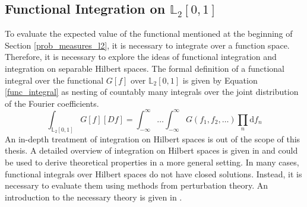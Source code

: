 \documentclass[12pt, a4paper]{article}
\theoremstyle{MAstyle} \newtheorem{assumption}{Assumption}[section]
\theoremstyle{MAstyle} \newtheorem{definition}{Definition}[section]
\theoremstyle{MAstyle} \newtheorem{theorem}{Theorem}[section]
\begin{document}
		\subsection{Functional Integration on $\mathbb{L}_2[0,1]$}\label{Integration}
			To evaluate the expected value of the functional mentioned at the beginning of Section \ref{prob_measures_l2}, it is necessary to integrate over a function space. Therefore, it is necessary to explore the ideas of functional integration and integration on separable Hilbert spaces. 
			The formal definition of a functional integral over the functional $G[f]$ over $\mathbb{L}_2[0,1]$ is given by Equation \ref{func_integral} as nesting of countably many integrals over the joint distribution of the Fourier coefficients. 
			\begin{equation}\label{func_integral}
				\int_{\mathbb{L}_2[0,1]} G\left[f\right] \left[Df\right] = \int_{-\infty}^{\infty}\dots\int_{-\infty}^{\infty} G\left(f_1, f_2, \dots\right) \prod_{n} \mathrm{d}f_n
			\end{equation}
			An in-depth treatment of integration on Hilbert spaces is out of the scope of this thesis. A detailed overview of integration on Hilbert spaces is given in \cite{skorohod_integration_1974} and could be used to derive theoretical properties in a more general setting. In many cases, functional integrals over Hilbert spaces do not have closed solutions. Instead, it is necessary to evaluate them using methods from perturbation theory. An introduction to the necessary theory is given in \cite{jeribi_perturbation_2021}.\\
			
\end{document}
